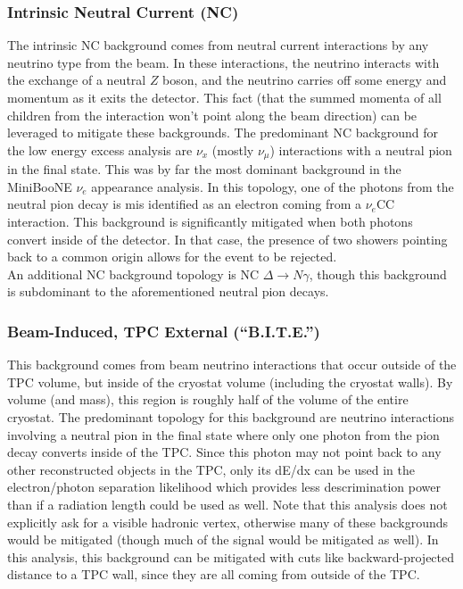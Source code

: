 \subsubsection{Intrinsic Neutral Current (NC)}
The intrinsic NC background comes from neutral current interactions by any neutrino type from the beam. In these interactions, the neutrino interacts with the exchange of a neutral $Z$ boson, and the neutrino carries off some energy and momentum as it exits the detector. This fact (that the summed momenta of all children from the interaction won't point along the beam direction) can be leveraged to mitigate these backgrounds. The predominant NC background for the low energy excess analysis are $\nu_x$ (mostly $\nu_\mu$) interactions with a neutral pion in the final state. This was by far the most dominant background in the MiniBooNE $\nu_e$ appearance analysis. In this topology, one of the photons from the neutral pion decay is mis identified as an electron coming from a $\nu_e$CC interaction. This background is significantly mitigated when both photons convert inside of the detector. In that case, the presence of two showers pointing back to a common origin allows for the event to be rejected.\\

An additional NC background topology is NC $\Delta \rightarrow N\gamma$, though this background is subdominant to the aforementioned neutral pion decays.

\subsubsection{Beam-Induced, TPC External (``B.I.T.E.'')}\label{BITE_physics_section}
This background comes from beam neutrino interactions that occur outside of the TPC volume, but inside of the cryostat volume (including the cryostat walls). By volume (and mass), this region is roughly half of the volume of the entire cryostat. The predominant topology for this background are neutrino interactions involving a neutral pion in the final state where only one photon from the pion decay converts inside of the TPC. Since this photon may not point back to any other reconstructed objects in the TPC, only its dE/dx can be used in the electron/photon separation likelihood which provides less descrimination power than if a radiation length could be used as well. Note that this analysis does not explicitly ask for a visible hadronic vertex, otherwise many of these backgrounds would be mitigated (though much of the signal would be mitigated as well). In this analysis, this background can be mitigated with cuts like backward-projected distance to a TPC wall, since they are all coming from outside of the TPC.

